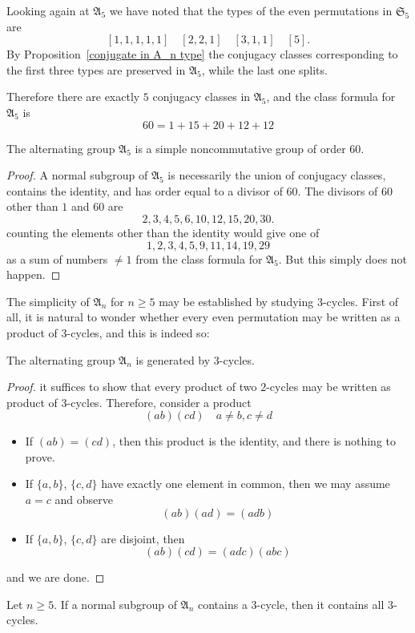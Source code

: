 \begin{example}
Looking again at $\mathfrak{A}_5$ we have noted that the types of the even permutations in $\mathfrak{S}_5$ are 
\[[1,1,1,1,1]\quad[2,2,1]\quad[3,1,1]\quad[5].\] 
By Proposition~\ref{conjugate in A_n type} the conjugacy classes corresponding to the first three types are preserved in $\mathfrak{A}_5$, while the last one splits.\par
Therefore there are exactly $5$ conjugacy classes in $\mathfrak{A}_5$, and the class formula for $\mathfrak{A}_5$ is
\[60=1+15+20+12+12\]
\end{example}
\begin{corollary}
The alternating group $\mathfrak{A}_5$ is a simple noncommutative group of
order $60$.
\end{corollary}
\begin{proof}
A normal subgroup of $\mathfrak{A}_5$ is necessarily the union of conjugacy classes, contains the identity, and has order equal to a divisor of $60$. The divisors of $60$ other than $1$ and $60$ are
\[2,3,4,5,6,10,12,15,20,30.\]
counting the elements other than the identity would give one of
\[1,2,3,4,5,9,11,14,19,29\]
as a sum of numbers $\neq1$ from the class formula for $\mathfrak{A}_5$. But this simply does not happen.
\end{proof}
The simplicity of $\mathfrak{A}_n$ for $n\geq 5$ may be established by studying $3$-cycles. First of all, it is natural to wonder whether every even permutation may be written as a product of $3$-cycles, and this is indeed so:
\begin{lemma}
The alternating group $\mathfrak{A}_n$ is generated by $3$-cycles.
\end{lemma}
\begin{proof}
it suffices to show that every product of two $2$-cycles may be written as product of $3$-cycles. Therefore, consider a product
\[(ab)(cd)\quad a\neq b,c\neq d\]
\begin{itemize}
\item If $(ab)=(cd)$, then this product is the identity, and there is nothing to prove.
\item If $\{a,b\}$, $\{c,d\}$ have exactly one element in common, then we may assume $a=c$ and observe
\[(ab)(ad)=(adb)\]
\item If $\{a,b\}$, $\{c,d\}$ are disjoint, then
\[(ab)(cd)=(adc)(abc)\]
\end{itemize}
and we are done.
\end{proof}
\begin{lemma}\label{cycle 3 A_n}
Let $n\geq 5$. If a normal subgroup of $\mathfrak{A}_n$ contains a $3$-cycle, then it contains all $3$-cycles.
\end{lemma}
